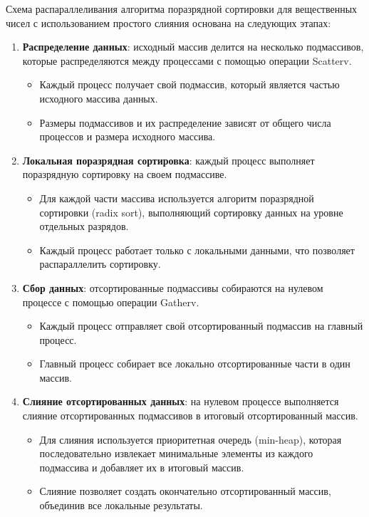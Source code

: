 \documentclass[12pt]{article}
\begin{document}
	\hspace*{1.25em}Схема распараллеливания алгоритма поразрядной сортировки для вещественных чисел с использованием простого слияния основана на следующих этапах:
	\begin{enumerate}
		\item \textbf{Распределение данных}: исходный массив делится на несколько подмассивов, которые распределяются между процессами с помощью операции Scatterv.
		\begin{itemize}
			\item Каждый процесс получает свой подмассив, который является частью исходного массива данных.
			\item Размеры подмассивов и их распределение зависят от общего числа процессов и размера исходного массива.
		\end{itemize}
		
		\item \textbf{Локальная поразрядная сортировка}: каждый процесс выполняет поразрядную сортировку на своем подмассиве.
		\begin{itemize}
			\item Для каждой части массива используется алгоритм поразрядной сортировки (radix sort), выполняющий сортировку данных на уровне отдельных разрядов.
			\item Каждый процесс работает только с локальными данными, что позволяет распараллелить сортировку.
		\end{itemize}
		
		\item \textbf{Сбор данных}: отсортированные подмассивы собираются на нулевом процессе с помощью операции Gatherv.
		\begin{itemize}
			\item Каждый процесс отправляет свой отсортированный подмассив на главный процесс.
			\item Главный процесс собирает все локально отсортированные части в один массив.
		\end{itemize}
		
		\item \textbf{Слияние отсортированных данных}: на нулевом процессе выполняется слияние отсортированных подмассивов в итоговый отсортированный массив.
		\begin{itemize}
			\item Для слияния используется приоритетная очередь (min-heap), которая последовательно извлекает минимальные элементы из каждого подмассива и добавляет их в итоговый массив.
			\item Слияние позволяет создать окончательно отсортированный массив, объединив все локальные результаты.
		\end{itemize}
		

\end{enumerate}
\end{document}
